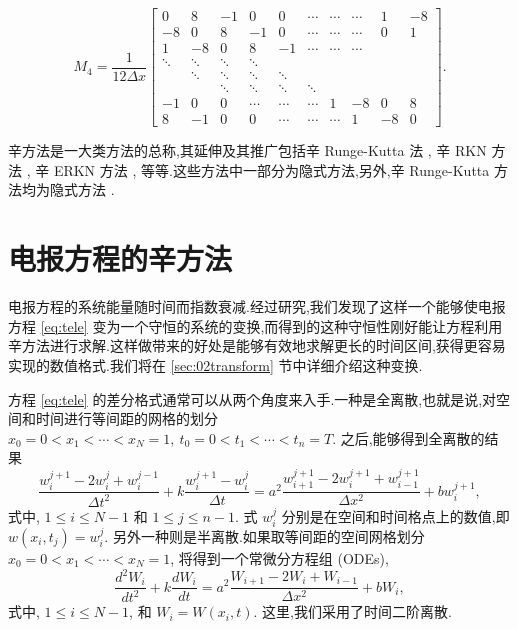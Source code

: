 \begin{equation*}
	M_4=\frac{1}{12\Delta x}\begin{bmatrix}
0 & 8 & -1 & 0 & 0 & \cdots & \cdots & \cdots & 1 & -8\\
-8 & 0 & 8 & -1 & 0 & \cdots & \cdots & \cdots & 0 & 1\\
1 & -8 & 0 & 8 & -1 & \cdots & \cdots & \cdots && \\
\ddots & \ddots & \ddots & \ddots &   &   &   &   && \\
&\ddots & \ddots & \ddots & \ddots &   &   &   &&\\
&&\ddots & \ddots & \ddots & \ddots &   &   && \\
-1 & 0 & 0 & \cdots & \cdots & \cdots & 1 & -8 & 0&8 \\
8&-1 & 0 & 0 & \cdots  & \cdots & \cdots & 1 & -8 & 0
\end{bmatrix}.
\end{equation*}

辛方法是一大类方法的总称,其延伸及其推广包括辛 Runge-Kutta 法 \cite{feng2010symplectic,burrage2014structure}, 辛 RKN 方法 \cite{monovasilis2013exponentially}, 辛 ERKN 方法 \cite{yang2009extended}, 等等.这些方法中一部分为隐式方法,另外,辛 Runge-Kutta 方法均为隐式方法 \cite{sanz1988runge}.

\section{电报方程的辛方法}\label{sec:02telegraph}

电报方程的系统能量随时间而指数衰减.经过研究,我们发现了这样一个能够使电报方程 \eqref{eq:tele} 变为一个守恒的系统的变换,而得到的这种守恒性刚好能让方程利用辛方法进行求解.这样做带来的好处是能够有效地求解更长的时间区间,获得更容易实现的数值格式.我们将在 \ref{sec:02transform} 节中详细介绍这种变换.

方程 \eqref{eq:tele} 的差分格式通常可以从两个角度来入手.一种是全离散,也就是说,对空间和时间进行等间距的网格的划分 $x_0=0<x_1<\cdots<x_N=1,~t_0=0<t_1<\cdots<t_n=T$. 之后,能够得到全离散的结果
\begin{equation}\label{eq:fulld}
\frac{w_{i}^{j+1}-2w_{i}^{j}+w_{i}^{j-1}}{\Delta t^2}+k\frac{w_{i}^{j+1}-w_{i}^{j}}{\Delta t}=a^2
\frac{w_{i+1}^{j+1}-2w_{i}^{j+1}+w_{i-1}^{j+1}}{\Delta x^2} + b w_{i}^{j+1},
\end{equation}
式中, $1 \le i \le N-1$ 和 $1 \le j \le n-1$. 式 $w_{i}^{j}$ 分别是在空间和时间格点上的数值,即$w(x_i,t_j)=w_{i}^{j}$.
另外一种则是半离散.如果取等间距的空间网格划分 $x_0=0<x_1<\cdots<x_N=1$, 将得到一个常微分方程组 (ODEs),
\begin{equation*}
\frac{d^2 W_i}{d t^2}+k\frac{d W_i}{d t}=a^2 \frac{W_{i+1}-2W_{i}+W_{i-1}}{\Delta x^2} + b W_i,
\end{equation*}
式中, $1 \le i \le N-1$, 和 $W_i = W(x_i,t)$. 这里,我们采用了时间二阶离散.

